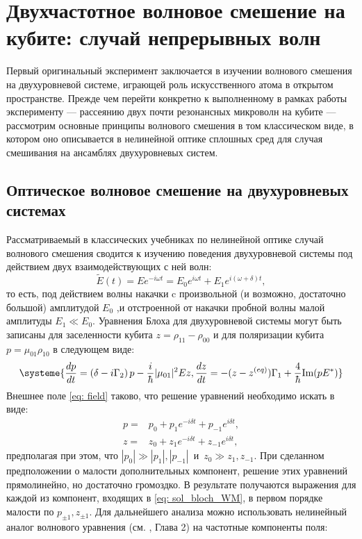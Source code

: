 \chapter{Двухчастотное волновое смешение на кубите: случай непрерывных волн}
Первый оригинальный эксперимент заключается в изучении волнового смешения на двухуровневой системе, играющей роль искусственного атома в открытом пространстве. Прежде чем перейти конкретно к выполненному в рамках работы эксперименту --- рассеянию двух почти резонансных микроволн на кубите --- рассмотрим основные принципы волнового смешения в том классическом виде, в котором оно описывается в нелинейной оптике сплошных сред для случая смешивания на ансамблях двухуровневых систем.
\section{Оптическое волновое смешение на двухуровневых системах}
Рассматриваемый в классических учебниках по нелинейной оптике случай волнового смешения сводится к изучению поведения двухуровневой системы под действием двух взаимодействующих с ней волн:
\begin{equation}
\tilde{E}(t) = Ee^{-i\omega t} = E_0e^{i\omega t} + E_1e^{i(\omega+\delta) t},
\label{eq: field}
\end{equation}
то есть, под действием волны накачки c произвольной (и возможно, достаточно большой) амплитудой $E_0$ ,и отстроенной от накачки пробной волны малой амплитуды $E_1 \ll E_0$. Уравнения Блоха для двухуровневой системы могут быть записаны для заселенности кубита $z = \rho_{11}-\rho_{00}$ и для поляризации кубита $p=\mu_{01}\rho_{10}$ в следующем виде:
\begin{equation}
\systeme{\frac{dp}{dt} = \left(\delta-i\Gamma_2\right)p -\frac{i}{\hbar}|\mu_{01}|^2Ez,
	 \frac{dz}{dt} = -(z-z^{(eq)})\Gamma_1 + \frac{4}{\hbar}\text{Im}(pE^*)}
\end{equation}
Внешнее поле \eqref{eq: field} таково, что решение уравнений необходимо искать в виде:
\begin{align}
	p =& p_0 + p_1 e^{-i\delta t} + p_{-1}e^{i\delta t}, \\
	z =& z_0 + z_1 e^{-i\delta t} + z_{-1}e^{i\delta t},
\label{eq: sol_bloch_WM}
\end{align}
предполагая при этом, что $|p_0| \gg |p_1|, |p_{-1}|$~и~$z_0 \gg z_1, z_{-1}$.  При сделанном предположении о малости дополнительных компонент, решение этих уравнений прямолинейно, но достаточно громоздко. В результате получаются выражения для каждой из компонент, входящих в \eqref{eq: sol_bloch_WM}, в первом порядке малости по $p_{\pm 1}, z_{\pm 1}$. Для дальнейшего анализа можно использовать нелинейный аналог волнового уравнения (см. \cite{boyd2003nonlinear}, Глава 2) на частотные компоненты поля:
